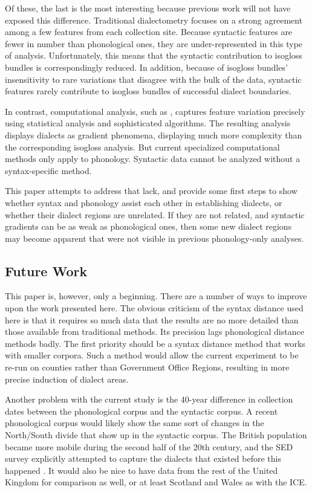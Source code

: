 \documentclass[11pt]{article}
\begin{document}
Of these, the last is the most interesting because previous work will
not have exposed this difference. Traditional dialectometry focuses
on a strong agreement among a few features from each collection
site. Because syntactic features are fewer in number than phonological
ones, they are under-represented in this type of
analysis. Unfortunately, this means that the syntactic contribution to
isogloss bundles is correspondingly reduced. In addition, because of
isogloss bundles' insensitivity to rare variations that disagree with
the bulk of the data, syntactic features rarely contribute to
isogloss bundles of successful dialect boundaries.

In contrast, computational analysis, such as \cite{shackleton07},
captures feature variation precisely using statistical analysis and
sophisticated algorithms. The resulting analysis displays dialects as
gradient phenomena, displaying much more complexity than the
corresponding isogloss analysis. But current specialized computational
methods only apply to phonology. Syntactic data cannot be analyzed
without a syntax-specific method.

This paper attempts to address that lack, and provide some first steps
to show whether syntax and phonology assist each other in establishing
dialects, or whether their dialect regions are unrelated. If they are not
related, and syntactic gradients can be as weak as phonological ones,
then some new dialect regions may become apparent that were not visible in
previous phonology-only analyses.

\subsection{Future Work}

This paper is, however, only a beginning. There are a number of ways
to improve upon the work presented here. The obvious criticism of the
syntax distance used here is that it requires so much data that the
results are no more detailed than those available from traditional
methods. Its precision lags phonological distance methods badly. The
first priority should be a syntax distance method that works with
smaller corpora. Such a method would allow the current experiment to
be re-run on counties rather than Government Office Regions, resulting
in more precise induction of dialect areas.

Another problem with the current study is the 40-year difference in
collection dates between the phonological corpus and the syntactic
corpus. A recent phonological corpus would likely show the same sort
of changes in the North/South divide that show up in the syntactic
corpus. The British population became more mobile during the second
half of the 20th century, and the SED survey explicitly attempted to capture
the dialects that existed before this happened \cite{orton78}.
It would also be nice to have data from the rest of the United Kingdom for
comparison as well, or at least Scotland and Wales as with the ICE.
\end{document}
